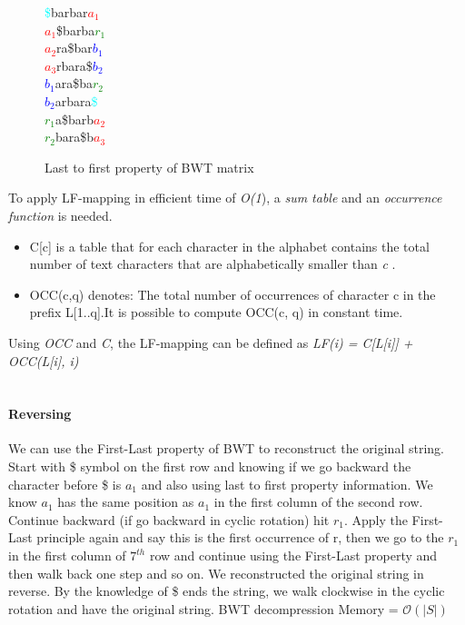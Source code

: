 \documentclass[11pt,a4paper]{report}
\begin{document}
\begin{figure}[H]
\centering
\textcolor{cyan}{\$}barbar\textcolor{red}{$a_1$}\\
\textcolor{red}{$a_1$}\$barba\textcolor{green}{$r_1$}\\
\textcolor{red}{$a_2$}ra\$bar\textcolor{blue}{$b_1$}\\
\textcolor{red}{$a_3$}rbara\$\textcolor{blue}{$b_2$}\\
\textcolor{blue}{$b_1$}ara\$ba\textcolor{green}{$r_2$}\\
\textcolor{blue}{$b_2$}arbara\textcolor{cyan}{\$}\\
\textcolor{green}{$r_1$}a\$barb\textcolor{red}{$a_2$}\\
\textcolor{green}{$r_2$}bara\$b\textcolor{red}{$a_3$}
 \caption{Last to first property of BWT matrix}
 \label{Lemma1}
\end{figure}

To apply LF-mapping in efficient time of \emph{O(1}), 
a \emph{sum table} and an \emph{occurrence function }is needed.\\


\begin{itemize}

	\item C[c] is a table that for each character in 
	the alphabet contains the total number of text 
	characters that are alphabetically smaller than
	 \emph{c} \cite{fmindex}.

	
	\item OCC(c,q) denotes:  The total number of 
	occurrences of character c in the prefix 
	L[1..q]\cite{fmindex}.It is possible to 
	compute OCC(c, q) in constant time.
	
\end{itemize}

Using \emph{OCC} and \emph{C}, the LF-mapping 
can be defined as 
\emph{LF(i) = C[L[i]] + OCC(L[i], i)} \\\\

\paragraph{Reversing}



We can use the First-Last property of BWT to reconstruct
the original string. Start with \$ symbol on the first 
row and knowing if we go backward the character before 
\$ is $a_1$ and also using last to first property information. 
We know  $a_1$ has the same position as $a_1$ in the first 
column of the second row. Continue backward (if go backward 
in cyclic rotation) hit $r_1$. Apply the First-Last principle 
again and say this is the first occurrence of r, then we 
go to the  $r_1$ in the first column of $7^{th}$ row and 
continue using the First-Last property and then walk back 
one step and so on. We reconstructed the original string 
in reverse. By the knowledge of \$ ends the string, we 
walk clockwise in the cyclic rotation and have the original 
string.
BWT decompression Memory =  $\mathcal{O}(\lvert S \rvert)$ \\
\end{document}
